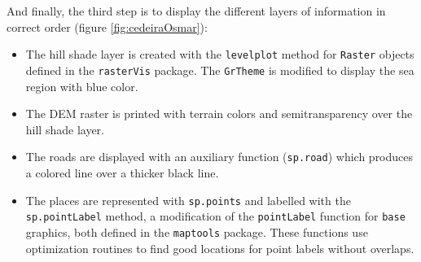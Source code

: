 And finally, the third step is to display the different layers of
information in correct order (figure \ref{fig:cedeiraOsmar}):

\begin{itemize}
\item The hill shade layer is created with the \texttt{levelplot} method for
  \texttt{Raster} objects defined in the \texttt{rasterVis} package. The
  \texttt{GrTheme} is modified to display the sea region with blue color.
\item The DEM raster is printed with terrain colors and
  semitransparency over the hill shade layer.
\item The roads are displayed with an auxiliary function (\texttt{sp.road})
  which produces a colored line over a thicker black line.
\item The places are represented with \texttt{sp.points} and labelled with
  the \texttt{sp.pointLabel} method, a modification of the \texttt{pointLabel}
  function for \texttt{base} graphics, both defined in the \texttt{maptools}
  package. These functions use optimization routines to find good
  locations for point labels without overlaps.
\end{itemize}


